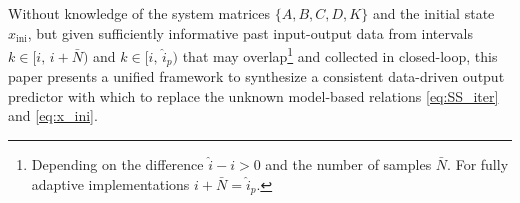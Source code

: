 %

Without knowledge of the system matrices $\{A,B,C,D,K\}$ and the initial state $x_\mathrm{ini}$, but given sufficiently informative past input-output data from  intervals $k\in[i,\,i+\bar{N})$ and $k\in[\hat{i},\,\hat{i}_p)$ that may overlap\footnote{Depending on the difference $\hat{i}-i>0$ and the number of samples $\bar{N}$. For fully adaptive implementations $i+\bar{N}=\hat{i}_p$.} and collected in closed-loop, this paper presents a unified framework to synthesize a consistent data-driven output predictor with which to replace the unknown model-based relations \eqref{eq:SS_iter} and \eqref{eq:x_ini}.